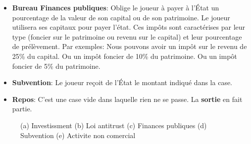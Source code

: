 \documentclass[12pt]{article}
\begin{document}
\begin{itemize}
        \item  \textbf{Bureau Finances publiques}: Oblige le joueur à payer à l'État un pourcentage de la valeur de son capital ou de son patrimoine.
        Le joueur utilisera ses capitaux pour payer l'état.
        Ces impôts sont caractérises par leur type (foncier sur le patrimoine ou revenu sur le capital) et leur pourcentage de prélèvement.
    Par exemples: Nous pouvons avoir un impôt sur le revenu de 25\% du capital. Ou un impôt foncier de 10\% du patrimoine. Ou un impôt foncier de 5\% du patrimoine.
        \item \textbf{Subvention}: Le joueur reçoit de l'État le montant indiqué dans la case.
        \item \textbf{Repos}: C'est une case vide dans laquelle rien ne se passe. La \textbf{sortie} en fait partie.
    \end{itemize}
    
    
	  \begin{figure}
    \centering

   
    \caption{(a) Investissment (b) Loi antitrust (c) Finances publiques (d) Subvention (e) Activite non comercial}
    \label{fig:cases}
\end{figure}
\end{document}
